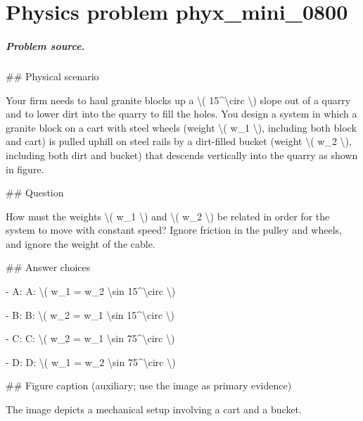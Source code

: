 
\chapter{Physics problem phyx\_mini\_0800}
\label{ch:PhyXMiniProblems_problem_phyx_mini_0800}

\paragraph{Problem source.}
\#\# Physical scenario

Your firm needs to haul granite blocks up a \textbackslash{}( 15\textasciicircum{}\textbackslash{}circ \textbackslash{}) slope out of a quarry and to lower dirt into the quarry to fill the holes. You design a system in which a granite block on a cart with steel wheels (weight \textbackslash{}( w\_1 \textbackslash{}), including both block and cart) is pulled uphill on steel rails by a dirt-filled bucket (weight \textbackslash{}( w\_2 \textbackslash{}), including both dirt and bucket) that descends vertically into the quarry as shown in figure.

\#\# Question

How must the weights \textbackslash{}( w\_1 \textbackslash{}) and \textbackslash{}( w\_2 \textbackslash{}) be related in order for the system to move with constant speed? Ignore friction in the pulley and wheels, and ignore the weight of the cable.

\#\# Answer choices

- A: A: \textbackslash{}( w\_1 = w\_2 \textbackslash{}sin 15\textasciicircum{}\textbackslash{}circ \textbackslash{})

- B: B: \textbackslash{}( w\_2 = w\_1 \textbackslash{}sin 15\textasciicircum{}\textbackslash{}circ \textbackslash{})

- C: C: \textbackslash{}( w\_2 = w\_1 \textbackslash{}sin 75\textasciicircum{}\textbackslash{}circ \textbackslash{})

- D: D: \textbackslash{}( w\_1 = w\_2 \textbackslash{}sin 75\textasciicircum{}\textbackslash{}circ \textbackslash{})

\#\# Figure caption (auxiliary; use the image as primary evidence)

The image depicts a mechanical setup involving a cart and a bucket. 

